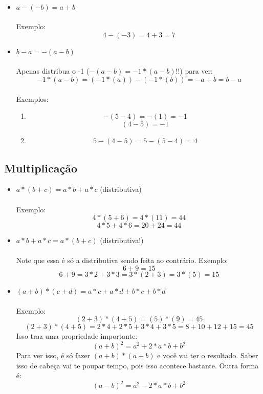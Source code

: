 \documentclass[11pt]{article}
\begin{document}
\paragraph{}
\begin{itemize}
	\item $a - (-b) = a + b$
	\paragraph{}
	Exemplo:
	$$4 - (-3) = 4 + 3 = 7$$
	\item $b - a = -(a - b)$
	\paragraph{}
	Apenas distribua o -1 ($-(a - b) = -1*(a - b)$!!) para ver:
	$$-1*(a - b) = (-1*(a)) - (-1*(b)) = -a + b = b - a$$
	\paragraph{}
	Exemplos:
	\begin{enumerate}
		\item 
		$$-(5 - 4) = -(1) = -1$$
		$$(4 - 5) = -1$$
		\item 
		$$5 - (4 - 5) = 5 - (5 - 4) = 4$$
	\end{enumerate}
\end{itemize}

\subsection{Multiplicação}
\begin{itemize}
	\item $a*(b+c) = a*b + a*c$ (distributiva)
	\paragraph{}
	Exemplo:
	$$4*(5 + 6) = 4*(11) = 44$$
	$$4*5 + 4*6 = 20 + 24 = 44$$
	\item $a*b + a*c = a*(b + c)$ (distributiva!)
	\paragraph{}
	Note que essa é só a distributiva sendo feita ao contrário. Exemplo:
	$$6 + 9 = 15$$
	$$6 + 9 = 3*2 + 3*3 = 3*(2 + 3) = 3*(5) = 15$$
	\item $(a + b)*(c + d) = a*c + a*d + b*c + b*d$
	\paragraph{}
	Exemplo:
	$$(2+3)*(4+5) = (5)*(9) = 45$$
	$$(2+3)*(4+5) = 2*4 + 2*5 + 3*4 + 3*5 = 8 + 10 + 12 + 15 = 45$$
	Isso traz uma propriedade importante:
	$${(a+b)}^2 = a^2 + 2*a*b + b^2$$
	Para ver isso, é só fazer $(a+b)*(a+b)$ e você vai ter o resultado. Saber 
	isso de cabeça vai te poupar tempo, pois isso acontece bastante. Outra 
	forma é:
	$${(a-b)}^2 = a^2 - 2*a*b + b^2$$
\end{itemize}
\end{document}
